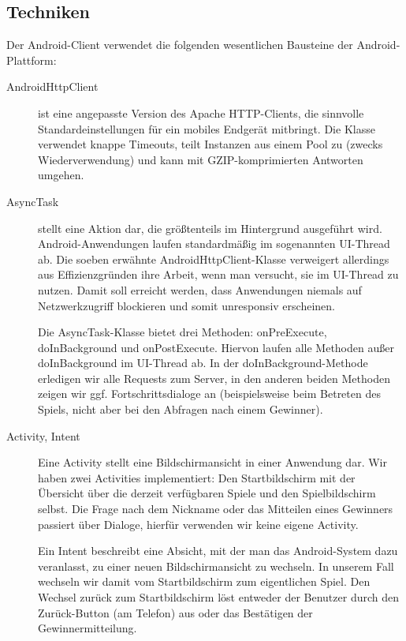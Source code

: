 \documentclass[12pt, a4paper]{scrartcl}
\begin{document}
\subsection{Techniken}

Der Android-Client verwendet die folgenden wesentlichen Bausteine der
Android-Plattform:

\begin{description}
	\item[AndroidHttpClient] ist eine angepasste Version des Apache
	HTTP-Clients, die sinnvolle Standardeinstellungen für ein mobiles
	Endgerät mitbringt. Die Klasse verwendet knappe Timeouts, teilt
	Instanzen aus einem Pool zu (zwecks Wie\-der\-ver\-wen\-dung) und kann mit
	GZIP-komprimierten Antworten umgehen.

	\item[AsyncTask] stellt eine Aktion dar, die größtenteils im
	Hintergrund ausgeführt wird. Android-Anwendungen laufen standardmäßig
	im sogenannten UI-Thread ab. Die soeben erwähnte
	AndroidHttpClient-Klasse verweigert allerdings aus Effizienzgründen
	ihre Arbeit, wenn man versucht, sie im UI-Thread zu nutzen. Damit soll
	erreicht werden, dass Anwendungen niemals auf Netzwerkzugriff
	blockieren und somit unresponsiv erscheinen.

	Die AsyncTask-Klasse bietet drei Methoden: onPreExecute, doInBackground
	und onPostExecute. Hiervon laufen alle Methoden außer doInBackground im
	UI-Thread ab. In der doInBackground-Methode erledigen wir alle Requests
	zum Server, in den anderen beiden Methoden zeigen wir ggf.
	Fortschrittsdialoge an (beispielsweise beim Betreten des Spiels, nicht
	aber bei den Abfragen nach einem Gewinner).

	\item[Activity, Intent] Eine Activity stellt eine Bildschirmansicht in
	einer Anwendung dar. Wir haben zwei Activities implementiert: Den
	Startbildschirm mit der Übersicht über die derzeit verfügbaren Spiele
	und den Spielbildschirm selbst. Die Frage nach dem Nickname oder das
	Mitteilen eines Gewinners passiert über Dialoge, hierfür verwenden wir
	keine eigene Activity.

	Ein Intent beschreibt eine Absicht, mit der man das Android-System dazu
	veranlasst, zu einer neuen Bildschirmansicht zu wechseln. In unserem
	Fall wechseln wir damit vom Startbildschirm zum eigentlichen Spiel. Den
	Wechsel zurück zum Startbildschirm löst entweder der Benutzer durch den
	Zurück-Button (am Telefon) aus oder das Bestätigen der
	Gewinnermitteilung.
\end{description}
\end{document}

